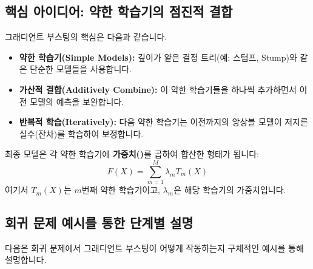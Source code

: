 \documentclass[11pt,a4paper]{book}
\theoremstyle{definition}
\begin{document}
\subsection{핵심 아이디어: 약한 학습기의 점진적 결합}
그래디언트 부스팅의 핵심은 다음과 같습니다.
\begin{itemize}
    \item \textbf{약한 학습기(Simple Models):} 깊이가 얕은 결정 트리(예: 스텀프, Stump)와 같은 단순한 모델들을 사용합니다.
    \item \textbf{가산적 결합(Additively Combine):} 이 약한 학습기들을 하나씩 추가하면서 이전 모델의 예측을 보완합니다.
    \item \textbf{반복적 학습(Iteratively):} 다음 약한 학습기는 이전까지의 앙상블 모델이 저지른 실수(잔차)를 학습하여 보정합니다.
\end{itemize}
최종 모델은 각 약한 학습기에 \textbf{가중치(\texttt{\lambda})}를 곱하여 합산한 형태가 됩니다:
\[ F(X) = \sum_{m=1}^{M} \lambda_m T_m(X) \]
여기서 $T_m(X)$는 $m$번째 약한 학습기이고, $\lambda_m$은 해당 학습기의 가중치입니다.

\subsection{회귀 문제 예시를 통한 단계별 설명}
다음은 회귀 문제에서 그래디언트 부스팅이 어떻게 작동하는지 구체적인 예시를 통해 설명합니다.
\end{document}

